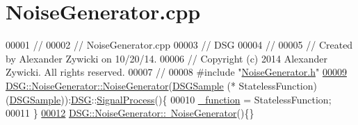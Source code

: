 \hypertarget{_noise_generator_8cpp_source}{\section{Noise\+Generator.\+cpp}
\label{_noise_generator_8cpp_source}
}

\begin{DoxyCode}
00001 \textcolor{comment}{//}
00002 \textcolor{comment}{//  NoiseGenerator.cpp}
00003 \textcolor{comment}{//  DSG}
00004 \textcolor{comment}{//}
00005 \textcolor{comment}{//  Created by Alexander Zywicki on 10/20/14.}
00006 \textcolor{comment}{//  Copyright (c) 2014 Alexander Zywicki. All rights reserved.}
00007 \textcolor{comment}{//}
00008 \textcolor{preprocessor}{#include "\hyperlink{_noise_generator_8h}{NoiseGenerator.h}"}
\hypertarget{_noise_generator_8cpp_source_l00009}{}\hyperlink{class_d_s_g_1_1_noise_generator_ac78b8347da0c0593d495d9d054821c34}{00009} \hyperlink{class_d_s_g_1_1_noise_generator_ac78b8347da0c0593d495d9d054821c34}{DSG::NoiseGenerator::NoiseGenerator}(\hyperlink{namespace_d_s_g_ac39a94cd27ebcd9c1e7502d0c624894a}{DSGSample} (*
      StatelessFunction)(\hyperlink{namespace_d_s_g_ac39a94cd27ebcd9c1e7502d0c624894a}{DSGSample})):\hyperlink{namespace_d_s_g}{DSG}::\hyperlink{class_d_s_g_1_1_signal_process}{SignalProcess}()\{
00010     \hyperlink{class_d_s_g_1_1_noise_generator_a3fe30476196e0bfa22e314ce9bbd368b}{\_function} = StatelessFunction;
00011 \}
\hypertarget{_noise_generator_8cpp_source_l00012}{}\hyperlink{class_d_s_g_1_1_noise_generator_a964f0af791b5e09e63470bf42ddbce79}{00012} \hyperlink{class_d_s_g_1_1_noise_generator_a964f0af791b5e09e63470bf42ddbce79}{DSG::NoiseGenerator::~NoiseGenerator}()\{\}
\end{DoxyCode}
